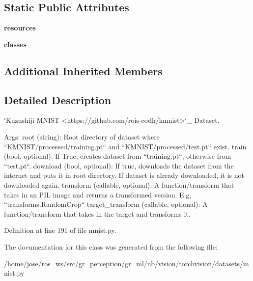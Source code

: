 \subsection*{Static Public Attributes}
\begin{DoxyCompactItemize}
\item 
\mbox{\label{classtorchvision_1_1datasets_1_1mnist_1_1KMNIST_a70eee4a42f709f7bf819b288bdfe2bec}} 
{\bfseries resources}
\item 
\mbox{\label{classtorchvision_1_1datasets_1_1mnist_1_1KMNIST_a9ed7d14dacdbfd7b29b8e649b71b5f8d}} 
{\bfseries classes}
\end{DoxyCompactItemize}
\subsection*{Additional Inherited Members}


\subsection{Detailed Description}
\begin{DoxyVerb}`Kuzushiji-MNIST <https://github.com/rois-codh/kmnist>`_ Dataset.

Args:
    root (string): Root directory of dataset where ``KMNIST/processed/training.pt``
        and  ``KMNIST/processed/test.pt`` exist.
    train (bool, optional): If True, creates dataset from ``training.pt``,
        otherwise from ``test.pt``.
    download (bool, optional): If true, downloads the dataset from the internet and
        puts it in root directory. If dataset is already downloaded, it is not
        downloaded again.
    transform (callable, optional): A function/transform that  takes in an PIL image
        and returns a transformed version. E.g, ``transforms.RandomCrop``
    target_transform (callable, optional): A function/transform that takes in the
        target and transforms it.
\end{DoxyVerb}
 

Definition at line 191 of file mnist.\+py.



The documentation for this class was generated from the following file\+:\begin{DoxyCompactItemize}
\item 
/home/jose/ros\+\_\+ws/src/gr\+\_\+perception/gr\+\_\+ml/nb/vision/torchvision/datasets/mnist.\+py\end{DoxyCompactItemize}
